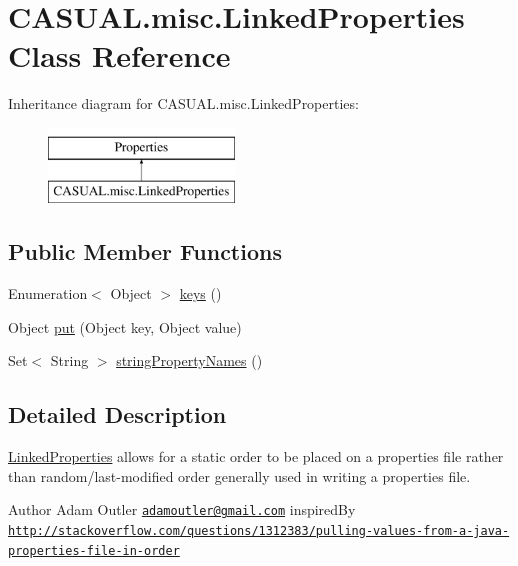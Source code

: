\hypertarget{classCASUAL_1_1misc_1_1LinkedProperties}{\section{C\-A\-S\-U\-A\-L.\-misc.\-Linked\-Properties Class Reference}
\label{classCASUAL_1_1misc_1_1LinkedProperties}
}
Inheritance diagram for C\-A\-S\-U\-A\-L.\-misc.\-Linked\-Properties\-:\begin{figure}[H]
\begin{center}
\leavevmode
\includegraphics[height=2.000000cm]{classCASUAL_1_1misc_1_1LinkedProperties}
\end{center}
\end{figure}
\subsection*{Public Member Functions}
\begin{DoxyCompactItemize}
\item 
Enumeration$<$ Object $>$ \hyperlink{classCASUAL_1_1misc_1_1LinkedProperties_a70ea068b7aef6f29a3221e6de67f962f}{keys} ()
\item 
Object \hyperlink{classCASUAL_1_1misc_1_1LinkedProperties_a56ef8e557095be6869bf1c4562cd6deb}{put} (Object key, Object value)
\item 
Set$<$ String $>$ \hyperlink{classCASUAL_1_1misc_1_1LinkedProperties_a2bc321d6ef4204f9d01b26fae22ae510}{string\-Property\-Names} ()
\end{DoxyCompactItemize}


\subsection{Detailed Description}
\hyperlink{classCASUAL_1_1misc_1_1LinkedProperties}{Linked\-Properties} allows for a static order to be placed on a properties file rather than random/last-\/modified order generally used in writing a properties file. \begin{DoxyAuthor}{Author}
Adam Outler \href{mailto:adamoutler@gmail.com}{\tt adamoutler@gmail.\-com} inspired\-By \href{http://stackoverflow.com/questions/1312383/pulling-values-from-a-java-properties-file-in-order}{\tt http\-://stackoverflow.\-com/questions/1312383/pulling-\/values-\/from-\/a-\/java-\/properties-\/file-\/in-\/order} 
\end{DoxyAuthor}


